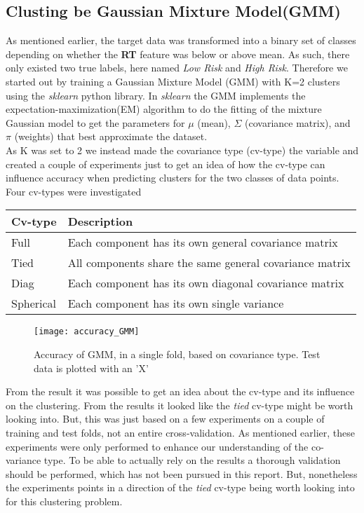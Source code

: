 \subsection{Clusting be Gaussian Mixture Model(GMM)}
As mentioned earlier, the target data was transformed into a binary set of classes depending on whether the \textbf{RT} feature was below or above mean. As such, there only existed two true labels, here named \textit{Low Risk} and \textit{High Risk}. Therefore we started out by training a Gaussian Mixture Model (GMM) with K=2 clusters using the \textit{sklearn} python library. In \textit{sklearn} the GMM implements the expectation-maximization(EM) algorithm to do the fitting of the mixture Gaussian model to get the parameters for $\mu$ (mean), $\Sigma$ (covariance matrix), and $\pi$ (weights) that best approximate the dataset.
\\
As K was set to 2 we instead made the covariance type (cv-type) the variable and created a couple of experiments just to get an idea of how the cv-type can influence accuracy when predicting clusters for the two classes of data points. Four cv-types were investigated
\begin{table}[H]
	\centering
	\begin{tabular}{|l|l|}
		\hline
		\textbf{Cv-type} & \textbf{Description} \\
		\hline
		Full & Each component has its own general covariance matrix\\
		Tied & All components share the same general covariance matrix\\
		Diag & Each component has its own diagonal covariance matrix\\
		Spherical & Each component has its own single variance\\
		\hline
	\end{tabular}
\end{table}
\noindent
\begin{figure}[H]
	\centering
	\texttt{[image: accuracy\_GMM]}
	\caption{Accuracy of GMM, in a single fold, based on covariance type. Test data is plotted with an 'X'}\label{fig:PCA}
\end{figure}\noindent
From the result it was possible to get an idea about the cv-type and its influence on the clustering. From the results it looked like the \textit{tied} cv-type might be worth looking into. But, this was just based on a few experiments on a couple of training and test folds, not an entire cross-validation. As mentioned earlier, these experiments were only performed to enhance our understanding of the co-variance type. To be able to actually rely on the results a thorough validation should be performed, which has not been pursued in this report. But, nonetheless the experiments points in a direction of the \textit{tied} cv-type being worth looking into for this clustering problem.
